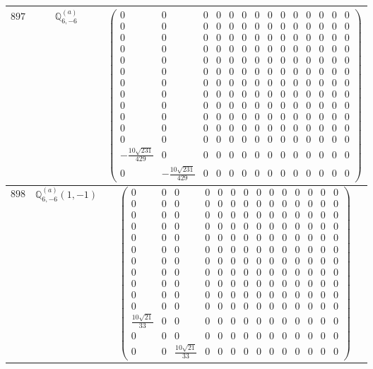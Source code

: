 \documentclass[fleqn,8pt,landscape]{jsarticle}
\begin{document}
\begin{center}
\begin{longtable}{ccc}
$ 897 $ & $ \mathbb{Q}_{6,-6}^{(a)} $ & $ \begin{pmatrix} 0 & 0 & 0 & 0 & 0 & 0 & 0 & 0 & 0 & 0 & 0 & 0 & 0 & 0 \\ 0 & 0 & 0 & 0 & 0 & 0 & 0 & 0 & 0 & 0 & 0 & 0 & 0 & 0 \\ 0 & 0 & 0 & 0 & 0 & 0 & 0 & 0 & 0 & 0 & 0 & 0 & 0 & 0 \\ 0 & 0 & 0 & 0 & 0 & 0 & 0 & 0 & 0 & 0 & 0 & 0 & 0 & 0 \\ 0 & 0 & 0 & 0 & 0 & 0 & 0 & 0 & 0 & 0 & 0 & 0 & 0 & 0 \\ 0 & 0 & 0 & 0 & 0 & 0 & 0 & 0 & 0 & 0 & 0 & 0 & 0 & 0 \\ 0 & 0 & 0 & 0 & 0 & 0 & 0 & 0 & 0 & 0 & 0 & 0 & 0 & 0 \\ 0 & 0 & 0 & 0 & 0 & 0 & 0 & 0 & 0 & 0 & 0 & 0 & 0 & 0 \\ 0 & 0 & 0 & 0 & 0 & 0 & 0 & 0 & 0 & 0 & 0 & 0 & 0 & 0 \\ 0 & 0 & 0 & 0 & 0 & 0 & 0 & 0 & 0 & 0 & 0 & 0 & 0 & 0 \\ 0 & 0 & 0 & 0 & 0 & 0 & 0 & 0 & 0 & 0 & 0 & 0 & 0 & 0 \\ 0 & 0 & 0 & 0 & 0 & 0 & 0 & 0 & 0 & 0 & 0 & 0 & 0 & 0 \\ - \frac{10 \sqrt{231}}{429} & 0 & 0 & 0 & 0 & 0 & 0 & 0 & 0 & 0 & 0 & 0 & 0 & 0 \\ 0 & - \frac{10 \sqrt{231}}{429} & 0 & 0 & 0 & 0 & 0 & 0 & 0 & 0 & 0 & 0 & 0 & 0 \end{pmatrix} $ \\ \hline
$ 898 $ & $ \mathbb{Q}_{6,-6}^{(a)}(1,-1) $ & $ \begin{pmatrix} 0 & 0 & 0 & 0 & 0 & 0 & 0 & 0 & 0 & 0 & 0 & 0 & 0 & 0 \\ 0 & 0 & 0 & 0 & 0 & 0 & 0 & 0 & 0 & 0 & 0 & 0 & 0 & 0 \\ 0 & 0 & 0 & 0 & 0 & 0 & 0 & 0 & 0 & 0 & 0 & 0 & 0 & 0 \\ 0 & 0 & 0 & 0 & 0 & 0 & 0 & 0 & 0 & 0 & 0 & 0 & 0 & 0 \\ 0 & 0 & 0 & 0 & 0 & 0 & 0 & 0 & 0 & 0 & 0 & 0 & 0 & 0 \\ 0 & 0 & 0 & 0 & 0 & 0 & 0 & 0 & 0 & 0 & 0 & 0 & 0 & 0 \\ 0 & 0 & 0 & 0 & 0 & 0 & 0 & 0 & 0 & 0 & 0 & 0 & 0 & 0 \\ 0 & 0 & 0 & 0 & 0 & 0 & 0 & 0 & 0 & 0 & 0 & 0 & 0 & 0 \\ 0 & 0 & 0 & 0 & 0 & 0 & 0 & 0 & 0 & 0 & 0 & 0 & 0 & 0 \\ 0 & 0 & 0 & 0 & 0 & 0 & 0 & 0 & 0 & 0 & 0 & 0 & 0 & 0 \\ 0 & 0 & 0 & 0 & 0 & 0 & 0 & 0 & 0 & 0 & 0 & 0 & 0 & 0 \\ \frac{10 \sqrt{21}}{33} & 0 & 0 & 0 & 0 & 0 & 0 & 0 & 0 & 0 & 0 & 0 & 0 & 0 \\ 0 & 0 & 0 & 0 & 0 & 0 & 0 & 0 & 0 & 0 & 0 & 0 & 0 & 0 \\ 0 & 0 & \frac{10 \sqrt{21}}{33} & 0 & 0 & 0 & 0 & 0 & 0 & 0 & 0 & 0 & 0 & 0 \end{pmatrix} $ \\ \hline

\end{longtable}
\end{center}
\end{document}
